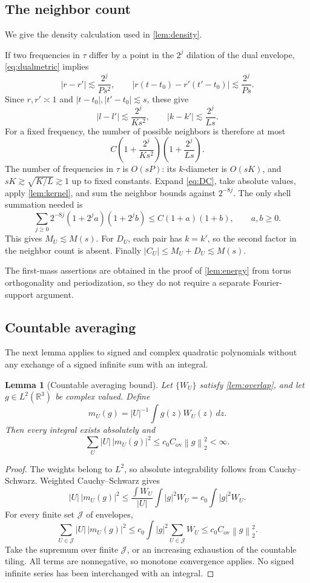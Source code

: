 \documentclass[11pt,reqno]{amsart}
\numberwithin{equation}{section}
\newtheorem{lemma}[lemma]{Lemma}
\theoremstyle{definition}
\theoremstyle{remark}
\newcommand{\R}{\mathbb R}
\newcommand{\norm}[1]{\left\lVert#1\right\rVert}
\begin{document}
\subsection{The neighbor count}\label{app:localdensity}
We give the density calculation used in \cref{lem:density}.

If two frequencies in $\tau$ differ by a point in the $2^j$ dilation of the dual envelope, \eqref{eq:dualmetric} implies
\[
 |r-r'|\lesssim\frac{2^j}{Ps^2},
 \qquad |r(t-t_0)-r'(t'-t_0)|\lesssim\frac{2^j}{Ps}.
\]
Since $r,r'\asymp1$ and $|t-t_0|,|t'-t_0|\lesssim s$, these give
\begin{equation}\label{eq:neighbours}
 |l-l'|\lesssim\frac{2^j}{Ks^2},
 \qquad |k-k'|\lesssim\frac{2^j}{Ls}.
\end{equation}
For a fixed frequency, the number of possible neighbors is therefore at most
\[
 C\left(1+\frac{2^j}{Ks^2}\right)
  \left(1+\frac{2^j}{Ls}\right).
\]
The number of frequencies in $\tau$ is $O(sP)$: its $k$-diameter is $O(sK)$, and $sK\gtrsim\sqrt{K/L}\gtrsim1$ up to fixed constants.
Expand \eqref{eq:DC}, take absolute values, apply \cref{lem:kernel}, and sum the neighbor bounds against $2^{-8j}$. The only shell summation needed is
\[
 \sum_{j\ge0}2^{-8j}(1+2^ja)(1+2^jb)\le C(1+a)(1+b),\qquad a,b\ge0.
\]
This gives $M_U\lesssim M(s)$.
For $D_U$, each pair has $k=k'$, so the second factor in the neighbor count is absent.
Finally $|C_U|\le M_U+D_U\lesssim M(s)$.


The first-mass assertions are obtained in the proof of \cref{lem:energy} from torus
orthogonality and periodization, so they do not require a separate Fourier-support
argument.

\subsection{Countable averaging}
The next lemma applies to signed and complex quadratic polynomials without any exchange
of a signed infinite sum with an integral.

\begin{lemma}[Countable averaging bound]\label{lem:countable}
Let $\{W_U\}$ satisfy \cref{lem:overlap}, and let $g\in L^2(\R^3)$ be complex valued. Define
\[
 m_U(g)=|U|^{-1}\int g(z)W_U(z)\,dz.
\]
Then every integral exists absolutely and
\begin{equation}\label{eq:countable}
 \sum_U|U|\,|m_U(g)|^2\le c_0C_{\mathrm{ov}}\norm g_2^2<\infty.
\end{equation}
\end{lemma}
\begin{proof}
The weights belong to $L^2$, so absolute integrability follows from Cauchy--Schwarz. Weighted Cauchy--Schwarz gives
\[
 |U|\,|m_U(g)|^2
 \le\frac{\int W_U}{|U|}\int|g|^2W_U
 =c_0\int|g|^2W_U.
\]
For every finite set $\mathcal J$ of envelopes,
\[
 \sum_{U\in\mathcal J}|U|\,|m_U(g)|^2
 \le c_0\int|g|^2\sum_{U\in\mathcal J}W_U
 \le c_0C_{\mathrm{ov}}\norm g_2^2.
\]
Take the supremum over finite $\mathcal J$, or an increasing exhaustion of the countable tiling. All terms are nonnegative, so monotone convergence applies. No signed infinite series has been interchanged with an integral.
\end{proof}
\end{document}
